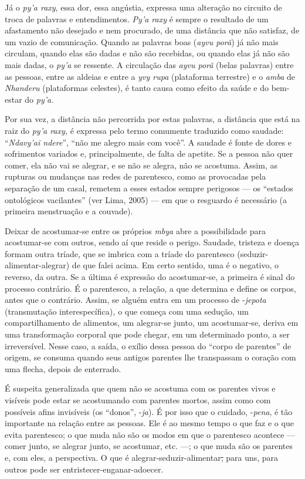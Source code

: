 Já o \emph{py'a raxy}, essa dor, essa angústia, expressa uma alteração
no circuito de troca de palavras e entendimentos. \emph{Py'a raxy} é
sempre o resultado de um afastamento não desejado e nem procurado, de
uma distância que não satisfaz, de um vazio de comunicação. Quando as
palavras boas (\emph{ayvu porã}) já não mais circulam, quando elas são
dadas e não são recebidas, ou quando elas já não são mais dadas, o
\emph{py'a} se ressente. A circulação das \emph{ayvu porã} (belas
palavras) entre as pessoas, entre as aldeias e entre a \emph{yvy rupa}
(plataforma terrestre) e o \emph{amba} de \emph{Nhanderu} (plataformas
celestes), é tanto causa como efeito da saúde e do bem-estar do
\emph{py'a.}

Por sua vez, a distância não percorrida por estas palavras, a distância
que está na raiz do \emph{py'a raxy,} é expressa pelo termo comumente
traduzido como saudade: ``\emph{Ndavy'ai ndere}'', ``não me alegro mais
com você''. A saudade é fonte de dores e sofrimentos variados e,
principalmente, de falta de apetite. Se a pessoa não quer comer, ela não
vai se alegrar, e se não se alegra, não se acostuma. Assim, as rupturas
ou mudanças nas redes de parentesco, como as provocadas pela separação
de um casal, remetem a esses estados sempre perigosos --- os ``estados
ontológicos vacilantes'' (ver Lima, 2005) --- em que o resguardo é
necessário (a primeira menstruação e a couvade).

Deixar de acostumar-se entre os próprios \emph{mbya} abre a
possibilidade para acostumar-se com outros, sendo aí que reside o
perigo. Saudade, tristeza e doença formam outra tríade, que se imbrica
com a tríade do parentesco (seduzir-alimentar-alegrar) de que falei
acima. Em certo sentido, uma é o negativo, o reverso, da outra. Se a
última é expressão do acostumar-se, a primeira é sinal do processo
contrário. É o parentesco, a relação, a que determina e define os
corpos, antes que o contrário. Assim, se alguém entra em um processo de
-\emph{jepota} (transmutação interespecífica)\emph{,} o que começa com
uma sedução, um compartilhamento de alimentos, um alegrar-se junto, um
acostumar-se, deriva em uma transformação corporal que pode chegar, em
um determinado ponto, a ser irreversível. Nesse caso, a saída, o exílio
dessa pessoa do ``corpo de parentes'' de origem, se consuma quando seus
antigos parentes lhe transpassam o coração com uma flecha, depois de
enterrado.

É suspeita generalizada que quem não se acostuma com os parentes vivos e
visíveis pode estar se acostumando com parentes mortos, assim como com
possíveis afins invisíveis (os ``donos'', -\emph{ja}). É por isso que o
cuidado, -\emph{pena}, é tão importante na relação entre as pessoas. Ele
é ao mesmo tempo o que faz e o que evita parentesco; o que muda não são
os modos em que o parentesco acontece --- comer junto, se alegrar junto,
se acostumar, etc. ---; o que muda são os parentes e, com eles, a
perspectiva. O que é alegrar-seduzir-alimentar\sout{,} para uns, para
outros pode ser entristecer-enganar-adoecer.

